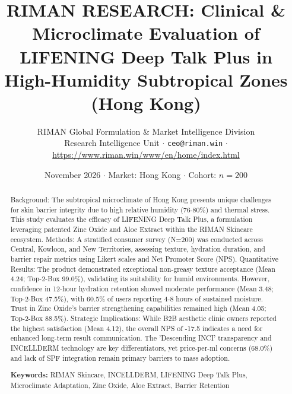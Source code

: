 \documentclass[10pt,twocolumn,a4paper]{article}
\title{\textbf{RIMAN RESEARCH: Clinical \& Microclimate Evaluation of LIFENING Deep Talk Plus in High-Humidity Subtropical Zones (Hong Kong)}}
\author{RIMAN Global Formulation \& Market Intelligence Division\\
\small Research Intelligence Unit $\cdot$ \texttt{ceo@riman.win} $\cdot$ \url{https://www.riman.win/www/en/home/index.html}}
\date{November 2026 \quad $\cdot$ \quad Market: Hong Kong \quad $\cdot$ \quad Cohort: $n = 200$}
\begin{document}
\maketitle

\begin{abstract}
Background: The subtropical microclimate of Hong Kong presents unique challenges for skin barrier integrity due to high relative humidity (76-80\%) and thermal stress. This study evaluates the efficacy of LIFENING Deep Talk Plus, a formulation leveraging patented Zinc Oxide and Aloe Extract within the RIMAN Skincare ecosystem. Methods: A stratified consumer survey (N=200) was conducted across Central, Kowloon, and New Territories, assessing texture, hydration duration, and barrier repair metrics using Likert scales and Net Promoter Score (NPS). Quantitative Results: The product demonstrated exceptional non-greasy texture acceptance (Mean 4.24; Top-2-Box 99.0\%), validating its suitability for humid environments. However, confidence in 12-hour hydration retention showed moderate performance (Mean 3.48; Top-2-Box 47.5\%), with 60.5\% of users reporting 4-8 hours of sustained moisture. Trust in Zinc Oxide’s barrier strengthening capabilities remained high (Mean 4.05; Top-2-Box 88.5\%). Strategic Implications: While B2B aesthetic clinic owners reported the highest satisfaction (Mean 4.12), the overall NPS of -17.5 indicates a need for enhanced long-term result communication. The 'Descending INCI' transparency and INCELLDERM technology are key differentiators, yet price-per-ml concerns (68.0\%) and lack of SPF integration remain primary barriers to mass adoption.

\vspace{0.4em}
\noindent\textbf{Keywords:} RIMAN Skincare, INCELLDERM, LIFENING Deep Talk Plus, Microclimate Adaptation, Zinc Oxide, Aloe Extract, Barrier Retention
\end{abstract}
\end{document}
